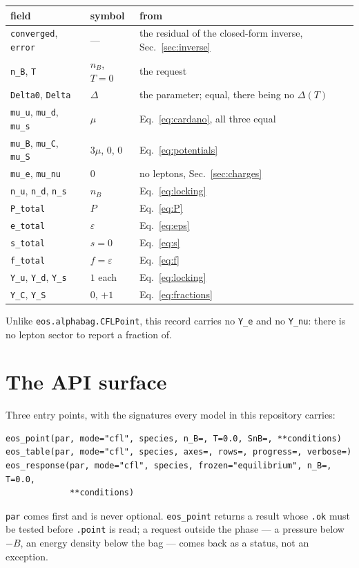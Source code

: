 \documentclass[aps,prc,onecolumn,superscriptaddress,nofootinbib,10pt]{revtex4-2}
\newcommand{\nB}{n_B}
\begin{document}
\begin{center}
\begin{tabular}{lll}
\toprule
field & symbol & from \\
\midrule
\texttt{converged}, \texttt{error} & --- & the residual of the closed-form
                                           inverse, Sec.~\ref{sec:inverse} \\
\texttt{n\_B}, \texttt{T}          & $\nB$, $T = 0$ & the request \\
\texttt{Delta0}, \texttt{Delta}    & $\Delta$ & the parameter; equal, there
                                                being no $\Delta(T)$ \\
\texttt{mu\_u}, \texttt{mu\_d}, \texttt{mu\_s} & $\mu$ & Eq.~\eqref{eq:cardano},
                                                all three equal \\
\texttt{mu\_B}, \texttt{mu\_C}, \texttt{mu\_S} & $3\mu$, $0$, $0$
                                               & Eq.~\eqref{eq:potentials} \\
\texttt{mu\_e}, \texttt{mu\_nu}    & $0$ & no leptons, Sec.~\ref{sec:charges} \\
\texttt{n\_u}, \texttt{n\_d}, \texttt{n\_s} & $\nB$ & Eq.~\eqref{eq:locking} \\
\texttt{P\_total}                  & $P$ & Eq.~\eqref{eq:P} \\
\texttt{e\_total}                  & $\varepsilon$ & Eq.~\eqref{eq:eps} \\
\texttt{s\_total}                  & $s = 0$ & Eq.~\eqref{eq:s} \\
\texttt{f\_total}                  & $f = \varepsilon$ & Eq.~\eqref{eq:f} \\
\texttt{Y\_u}, \texttt{Y\_d}, \texttt{Y\_s} & $1$ each & Eq.~\eqref{eq:locking} \\
\texttt{Y\_C}, \texttt{Y\_S}       & $0$, $+1$ & Eq.~\eqref{eq:fractions} \\
\bottomrule
\end{tabular}
\end{center}

\noindent
Unlike \texttt{eos.alphabag.CFLPoint}, this record carries no \texttt{Y\_e} and
no \texttt{Y\_nu}: there is no lepton sector to report a fraction of.

\section{The API surface}
\label{sec:api}

Three entry points, with the signatures every model in this repository carries:
%
\begin{verbatim}
eos_point(par, mode="cfl", species, n_B=, T=0.0, SnB=, **conditions)
eos_table(par, mode="cfl", species, axes=, rows=, progress=, verbose=)
eos_response(par, mode="cfl", species, frozen="equilibrium", n_B=, T=0.0,
             **conditions)
\end{verbatim}
%
\texttt{par} comes first and is never optional. \texttt{eos\_point} returns a
result whose \texttt{.ok} must be tested before \texttt{.point} is read; a
request outside the phase --- a pressure below $-B$, an energy density below
the bag --- comes back as a status, not an exception.
\end{document}
